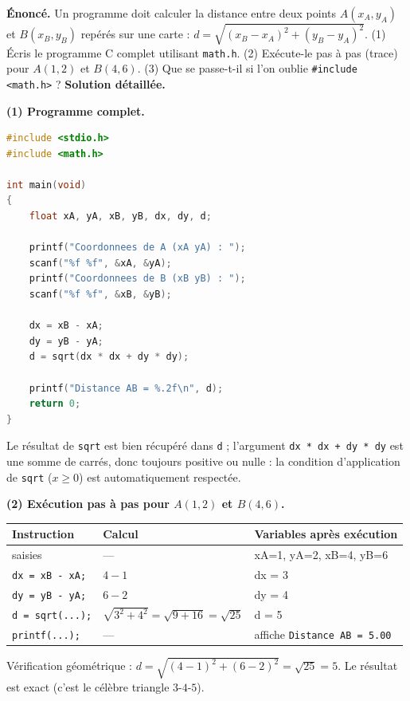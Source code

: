 \documentclass[11pt]{article}
\begin{document}
\begin{exoresolu}
\textbf{Énoncé.} Un programme doit calculer la distance entre deux points $A(x_A, y_A)$ et $B(x_B, y_B)$ repérés sur une carte : $d = \sqrt{(x_B - x_A)^2 + (y_B - y_A)^2}$. (1) Écris le programme C complet utilisant \texttt{math.h}. (2) Exécute-le pas à pas (trace) pour $A(1, 2)$ et $B(4, 6)$. (3) Que se passe-t-il si l'on oublie \texttt{\#include <math.h>} ?
\tcblower
\textbf{Solution détaillée.}

\textbf{(1) Programme complet.}
\begin{lstlisting}[language=C]
#include <stdio.h>
#include <math.h>

int main(void)
{
    float xA, yA, xB, yB, dx, dy, d;

    printf("Coordonnees de A (xA yA) : ");
    scanf("%f %f", &xA, &yA);
    printf("Coordonnees de B (xB yB) : ");
    scanf("%f %f", &xB, &yB);

    dx = xB - xA;
    dy = yB - yA;
    d = sqrt(dx * dx + dy * dy);

    printf("Distance AB = %.2f\n", d);
    return 0;
}
\end{lstlisting}
Le résultat de \texttt{sqrt} est bien récupéré dans \texttt{d} ; l'argument \texttt{dx * dx + dy * dy} est une somme de carrés, donc toujours positive ou nulle : la condition d'application de \texttt{sqrt} ($x \geq 0$) est automatiquement respectée.

\textbf{(2) Exécution pas à pas pour $A(1,2)$ et $B(4,6)$.}
\begin{center}
\begin{tabularx}{\linewidth}{|l|X|X|}
\hline
\rowcolor{popblueL} \textbf{Instruction} & \textbf{Calcul} & \textbf{Variables après exécution} \\
\hline
saisies & --- & xA=1, yA=2, xB=4, yB=6 \\
\hline
\texttt{dx = xB - xA;} & $4 - 1$ & dx = 3 \\
\hline
\texttt{dy = yB - yA;} & $6 - 2$ & dy = 4 \\
\hline
\texttt{d = sqrt(...);} & $\sqrt{3^2 + 4^2} = \sqrt{9+16} = \sqrt{25}$ & d = 5 \\
\hline
\texttt{printf(...);} & --- & affiche \texttt{Distance AB = 5.00} \\
\hline
\end{tabularx}
\end{center}
Vérification géométrique : $d = \sqrt{(4-1)^2 + (6-2)^2} = \sqrt{25} = 5$. Le résultat est exact (c'est le célèbre triangle $3$-$4$-$5$).


\end{exoresolu}
\end{document}
